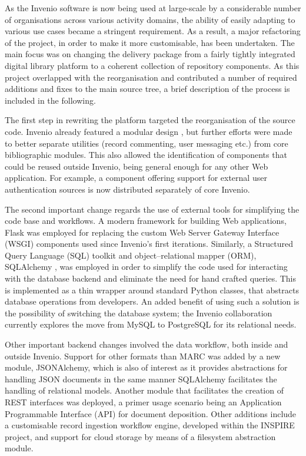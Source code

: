 
As the Invenio software is now being used at large-scale by a considerable
number of organisations across various activity domains, the ability of easily
adapting to various use cases became a stringent requirement. As a result, a
major refactoring of the project, in order to make it more customisable, has
been undertaken. The main focus was on changing the delivery package from a
fairly tightly integrated digital library platform to a coherent collection of
repository components. As this project overlapped with the reorganisation and
contributed a number of required additions and fixes to the main source tree, a
brief description of the process is included in the following.

The first step in rewriting the platform targeted the reorganisation of the
source code. Invenio already featured a modular design \cite{ref:lemeur}, but
further efforts were made to better separate utilities (record commenting, user
messaging etc.) from core bibliographic modules. This also allowed the
identification of components that could be reused outside Invenio, being
general enough for any other Web application. For example, a component offering
support for external user authentication sources is now distributed separately
of core Invenio.

The second important change regards the use of external tools for simplifying
the code base and workflows. A modern framework for building Web applications,
Flask \cite{ref:flask} was employed for replacing the custom Web Server Gateway
Interface (WSGI) components used since Invenio's first iterations. Similarly, a
Structured Query Language (SQL) toolkit and object--relational mapper (ORM),
SQLAlchemy \cite{ref:sqlalchemy}, was employed in order to simplify the code
used for interacting with the database backend and eliminate the need for hand
crafted queries. This is implemented as a thin wrapper around standard Python
classes, that abstracts database operations from developers. An added benefit
of using such a solution is the possibility of switching the database system;
the Invenio collaboration currently explores the move from MySQL to PostgreSQL
for its relational needs.

Other important backend changes involved the data workflow, both inside and
outside Invenio. Support for other formats than MARC was added by a new module,
JSONAlchemy, which is also of interest as it provides abstractions for handling
JSON documents in the same manner SQLAlchemy facilitates the handling of
relational models. Another module that facilitates the creation of REST
interfaces was deployed, a primer usage scenario being an Application
Programmable Interface (API) for document deposition.  Other additions include a
customisable record ingestion workflow engine, developed within the INSPIRE
project, and support for cloud storage by means of a filesystem abstraction
module.

